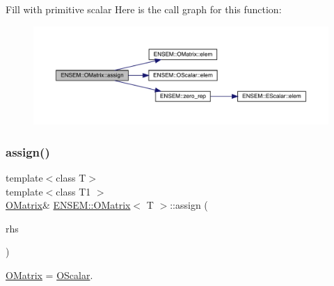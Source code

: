 Fill with primitive scalar Here is the call graph for this function\+:
\nopagebreak
\begin{figure}[H]
\begin{center}
\leavevmode
\includegraphics[width=350pt]{dd/d80/classENSEM_1_1OMatrix_af0aaac940f907eb3db104e9f57b90a4f_cgraph}
\end{center}
\end{figure}
\mbox{\label{classENSEM_1_1OMatrix_af0aaac940f907eb3db104e9f57b90a4f}} 
\subsubsection{\texorpdfstring{assign()}{assign()}\hspace{0.1cm}{\footnotesize\ttfamily [5/9]}}
{\footnotesize\ttfamily template$<$class T$>$ \\
template$<$class T1 $>$ \\
\mbox{\hyperlink{classENSEM_1_1OMatrix}{O\+Matrix}}\& \mbox{\hyperlink{classENSEM_1_1OMatrix}{E\+N\+S\+E\+M\+::\+O\+Matrix}}$<$ T $>$\+::assign (\begin{DoxyParamCaption}\item[{const \mbox{\hyperlink{classENSEM_1_1OScalar}{O\+Scalar}}$<$ T1 $>$ \&}]{rhs }\end{DoxyParamCaption})\hspace{0.3cm}{\ttfamily [inline]}}



\mbox{\hyperlink{classENSEM_1_1OMatrix}{O\+Matrix}} = \mbox{\hyperlink{classENSEM_1_1OScalar}{O\+Scalar}}. 

